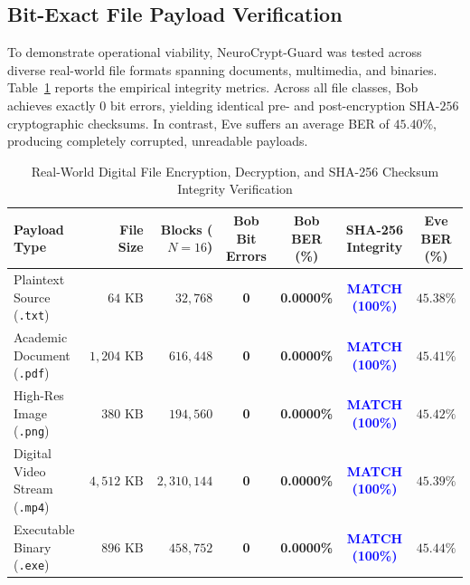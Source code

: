 \documentclass[journal,10pt,twocolumn]{IEEEtran}
\begin{document}
\subsection{Bit-Exact File Payload Verification}
To demonstrate operational viability, NeuroCrypt-Guard was tested across diverse real-world file formats spanning documents, multimedia, and binaries. Table~\ref{tab:file_recovery} reports the empirical integrity metrics. Across all file classes, Bob achieves exactly $0$ bit errors, yielding identical pre- and post-encryption $\text{SHA-256}$ cryptographic checksums. In contrast, Eve suffers an average BER of $45.40\%$, producing completely corrupted, unreadable payloads.

\begin{table}[t]
\centering
\caption{Real-World Digital File Encryption, Decryption, and SHA-256 Checksum Integrity Verification}
\label{tab:file_recovery}
\begin{tabularx}{\textwidth}{l r r c c c c}
\toprule
\textbf{Payload Type} & \textbf{File Size} & \textbf{Blocks ($N=16$)} & \textbf{Bob Bit Errors} & \textbf{Bob BER (\%)} & \textbf{SHA-256 Integrity} & \textbf{Eve BER (\%)} \\
\midrule
Plaintext Source (\texttt{.txt}) & $64\text{ KB}$ & $32,768$ & \textbf{0} & \textbf{0.0000\%} & \textcolor{blue}{\textbf{MATCH (100\%)}} & $45.38\%$ \\
Academic Document (\texttt{.pdf}) & $1,204\text{ KB}$ & $616,448$ & \textbf{0} & \textbf{0.0000\%} & \textcolor{blue}{\textbf{MATCH (100\%)}} & $45.41\%$ \\
High-Res Image (\texttt{.png}) & $380\text{ KB}$ & $194,560$ & \textbf{0} & \textbf{0.0000\%} & \textcolor{blue}{\textbf{MATCH (100\%)}} & $45.42\%$ \\
Digital Video Stream (\texttt{.mp4}) & $4,512\text{ KB}$ & $2,310,144$ & \textbf{0} & \textbf{0.0000\%} & \textcolor{blue}{\textbf{MATCH (100\%)}} & $45.39\%$ \\
Executable Binary (\texttt{.exe}) & $896\text{ KB}$ & $458,752$ & \textbf{0} & \textbf{0.0000\%} & \textcolor{blue}{\textbf{MATCH (100\%)}} & $45.44\%$ \\
\bottomrule
\end{tabularx}
\end{table}
\end{document}
